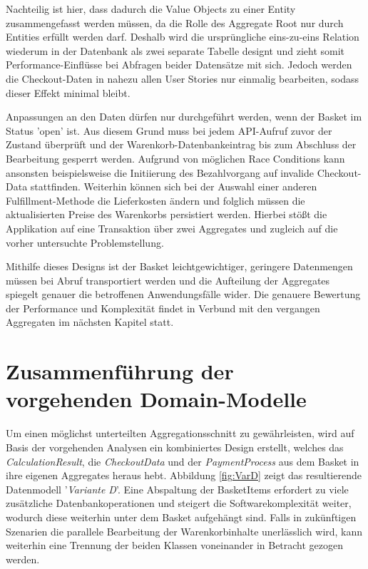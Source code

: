 Nachteilig ist hier, dass dadurch die Value Objects zu einer Entity zusammengefasst werden müssen, da die Rolle des Aggregate Root nur durch Entities erfüllt werden darf. Deshalb wird die ursprüngliche eins-zu-eins Relation wiederum in der Datenbank als zwei separate Tabelle designt und zieht somit Performance-Einflüsse bei Abfragen beider Datensätze mit sich. Jedoch werden die Checkout-Daten in nahezu allen User Stories nur einmalig bearbeiten, sodass dieser Effekt minimal bleibt.

Anpassungen an den Daten dürfen nur durchgeführt werden, wenn der Basket im Status 'open' ist. Aus diesem Grund muss bei jedem API-Aufruf zuvor der Zustand überprüft und der Warenkorb-Datenbankeintrag bis zum Abschluss der Bearbeitung gesperrt werden. Aufgrund von möglichen Race Conditions kann ansonsten beispielsweise die Initiierung des Bezahlvorgang auf invalide Checkout-Data stattfinden. Weiterhin können sich bei der Auswahl einer anderen Fulfillment-Methode die Lieferkosten ändern und folglich müssen die aktualisierten Preise des Warenkorbs persistiert werden. Hierbei stößt die Applikation auf eine Transaktion über zwei Aggregates und zugleich auf die vorher untersuchte Problemstellung.

Mithilfe dieses Designs ist der Basket leichtgewichtiger, geringere Datenmengen müssen bei Abruf transportiert werden und die Aufteilung der Aggregates spiegelt genauer die betroffenen Anwendungsfälle wider. Die genauere Bewertung der Performance und Komplexität findet in Verbund mit den vergangen Aggregaten im nächsten Kapitel statt.


\section{Zusammenführung der vorgehenden Domain-Modelle}

Um einen möglichst unterteilten Aggregationsschnitt zu gewährleisten, wird auf Basis der vorgehenden Analysen ein kombiniertes Design erstellt, welches das \emph{CalculationResult}, die \emph{CheckoutData} und der \emph{PaymentProcess} aus dem Basket in ihre eigenen Aggregates heraus hebt. Abbildung \ref{fig:VarD} zeigt das resultierende Datenmodell '\emph{Variante D}'. Eine Abspaltung der BasketItems erfordert zu viele zusätzliche Datenbankoperationen und steigert die Softwarekomplexität weiter, wodurch diese weiterhin unter dem Basket aufgehängt sind. Falls in zukünftigen Szenarien die parallele Bearbeitung der Warenkorbinhalte unerlässlich wird, kann weiterhin eine Trennung der beiden Klassen voneinander in Betracht gezogen werden.  

